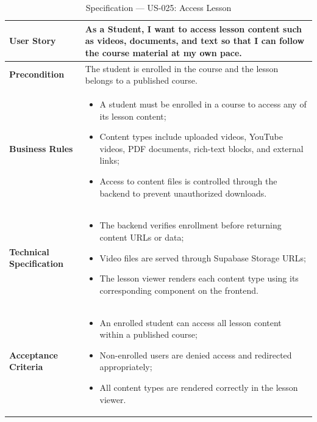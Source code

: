 \begin{table}[H]
\centering
\caption{Specification — US-025: Access Lesson}
\label{tab:us025}
\renewcommand{\arraystretch}{1.2}
\begin{tabularx}{\textwidth}{|p{3.5cm}|X|}
\hline
\textbf{User Story} & As a Student, I want to access lesson content such as videos, documents, and text so that I can follow the course material at my own pace. \\
\hline
\textbf{Precondition} & The student is enrolled in the course and the lesson belongs to a published course. \\
\hline
\textbf{Business Rules} &
\begin{itemize}[noitemsep, topsep=2pt]
  \item A student must be enrolled in a course to access any of its lesson content;
  \item Content types include uploaded videos, YouTube videos, PDF documents, rich-text blocks, and external links;
  \item Access to content files is controlled through the backend to prevent unauthorized downloads.
\end{itemize} \\
\hline
\textbf{Technical Specification} &
\begin{itemize}[noitemsep, topsep=2pt]
  \item The backend verifies enrollment before returning content URLs or data;
  \item Video files are served through Supabase Storage URLs;
  \item The lesson viewer renders each content type using its corresponding component on the frontend.
\end{itemize} \\
\hline
\textbf{Acceptance Criteria} &
\begin{itemize}[noitemsep, topsep=2pt]
  \item An enrolled student can access all lesson content within a published course;
  \item Non-enrolled users are denied access and redirected appropriately;
  \item All content types are rendered correctly in the lesson viewer.
\end{itemize} \\
\hline
\end{tabularx}
\end{table}

